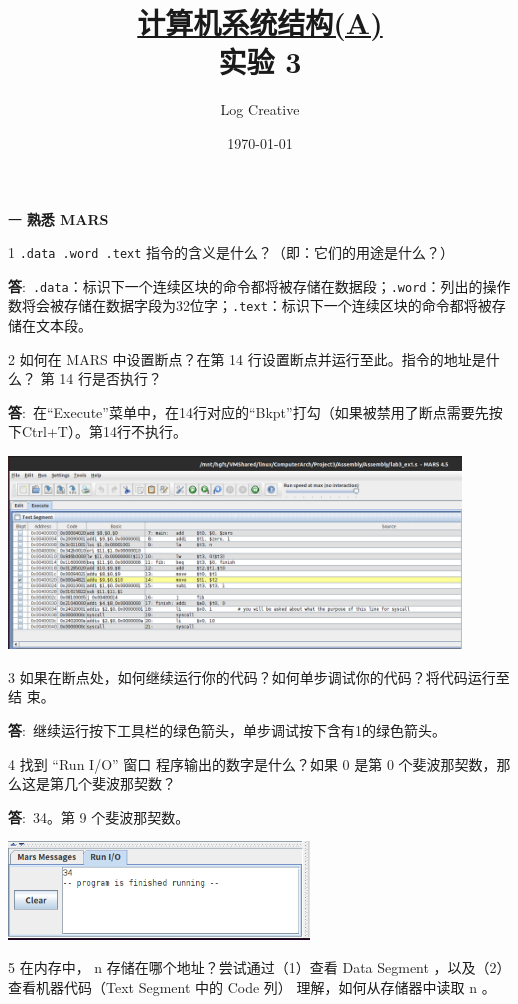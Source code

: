 \documentclass[12pt,a4paper]{article}
\newenvironment{problems}{\begin{list}{}{\renewcommand{\makelabel}[1]{\textbf{##1}.\hfil}}}{\end{list}}
\newenvironment{steps}{\begin{list}{}{\renewcommand{\makelabel}[1]{(##1)\hfil}}}{\end{list}}
\providecommand{\ans}{\textbf{答}:~}
\begin{document}
\title{\normalsize \underline{计算机系统结构(A)}\\\LARGE 实验 3}
\author{Log Creative }
\date{\today}
\maketitle

\begin{problems}
    \item[一] \textbf{熟悉 MARS}
    \begin{steps}
        \item[1] \verb".data .word .text" 指令的含义是什么？（即：它们的用途是什么？）
         
        \ans \verb".data"：标识下一个连续区块的命令都将被存储在数据段；\verb".word"：列出的操作数将会被存储在数据字段为32位字；\verb".text"：标识下一个连续区块的命令都将被存储在文本段。
        \item[2] 如何在 MARS 中设置断点？在第 14 行设置断点并运行至此。指令的地址是什么？
        第 14 行是否执行？
        
        \ans 在“Execute”菜单中，在14行对应的“Bkpt”打勾（如果被禁用了断点需要先按下Ctrl+T）。第14行不执行。

        \includegraphics[width=0.9\textwidth]{bkpt.png}

        \item[3] 如果在断点处，如何继续运行你的代码？如何单步调试你的代码？将代码运行至结
        束。
        
        \ans 继续运行按下工具栏的绿色箭头，单步调试按下含有1的绿色箭头。
        \item[4] 找到 “Run I/O” 窗口 程序输出的数字是什么？如果 0 是第 0 个斐波那契数，那
        么这是第几个斐波那契数？

        \ans 34。第 9 个斐波那契数。

        \includegraphics[width=0.6\textwidth]{run.png}
        \item[5] 在内存中， n 存储在哪个地址？尝试通过（1）查看 Data Segment ，以及（2）查看机器代码（Text Segment 中的 Code 列） 理解，如何从存储器中读取 n 。
        

\end{steps}
\end{problems}
\end{document}
